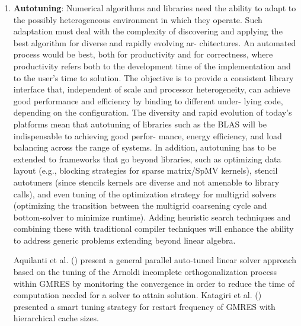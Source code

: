 \begin{enumerate}
	\item \textbf{Autotuning}: Numerical algorithms and libraries need the ability to adapt to the possibly heterogeneous environment in which they operate. Such adaptation must deal with the complexity of discovering and applying the best algorithm for diverse and rapidly evolving ar- chitectures. An automated process would be best, both for productivity and for correctness, where productivity refers both to the development time of the implementation and to the user’s time to solution. The objective is to provide a consistent library interface that, independent of scale and processor heterogeneity, can achieve good performance and efficiency by binding to different under- lying code, depending on the configuration. The diversity and rapid evolution of today’s platforms mean that autotuning of libraries such as the BLAS will be indispensable to achieving good perfor- mance, energy efficiency, and load balancing across the range of systems. In addition, autotuning has to be extended to frameworks that go beyond libraries, such as optimizing data layout (e.g., blocking strategies for sparse matrix/SpMV kernels), stencil autotuners (since stencils kernels are diverse and not amenable to library calls), and even tuning of the optimization strategy for multigrid solvers (optimizing the transition between the multigrid coarsening cycle and bottom-solver to minimize runtime). Adding heuristic search techniques and combining these with traditional compiler techniques will enhance the ability to address generic problems extending beyond linear algebra.
	
	Aquilanti et al. (\cite{aquilanti2011parallel}) present a general parallel auto-tuned linear solver approach based on the tuning of the Arnoldi incomplete orthogonalization process within GMRES by monitoring the convergence in order to reduce the time of computation needed for a solver to attain solution. Katagiri et al. (\cite{katagiri2012smart}) presented a smart tuning strategy for restart frequency of GMRES with hierarchical cache sizes.
	

\end{enumerate}
